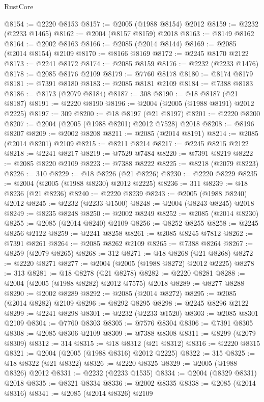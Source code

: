 \begin{lexlean}{RustCore}
\begin{coremodule}
@8154 := @2220 @8153
@8157 := @2005 (@1988 @8154) @2012
@8159 := @2232 (@2233 @1465)
@8162 := @2004 (@8157 @8159) @2018
@8163 := @8149 @8162
@8164 := @2002 @8163
@8166 := @2085 (@2014 @8144)
@8169 := @2085 (@2014 @8154) @2109
@8170 := @8166 @8169
@8172 := @2245 @8170 @2122
@8173 := @2241 @8172
@8174 := @2085 @8159
@8176 := @2232 (@2233 @1476)
@8178 := @2085 @8176 @2109
@8179 := @7760 @8178
@8180 := @8174 @8179
@8181 := @7391 @8180
@8183 := @2085 @8181 @2109
@8184 := @7388 @8183
@8186 := @8173 (@2079 @8184)
@8187 := 308
@8190 := @18 @8187 (@21 @8187)
@8191 := @2220 @8190
@8196 := @2004 (@2005 (@1988 @8191) @2012 @2225)
@8197 := 309
@8200 := @18 @8197 (@21 @8197)
@8201 := @2220 @8200
@8207 := @2004 (@2005 (@1988 @8201) @2012 @7528) @2018
@8208 := @8196 @8207
@8209 := @2002 @8208
@8211 := @2085 (@2014 @8191)
@8214 := @2085 (@2014 @8201) @2109
@8215 := @8211 @8214
@8217 := @2245 @8215 @2122
@8218 := @2241 @8217
@8219 := @7529 @7484
@8220 := @7391 @8219
@8222 := @2085 @8220 @2109
@8223 := @7388 @8222
@8225 := @8218 (@2079 @8223)
@8226 := 310
@8229 := @18 @8226 (@21 @8226)
@8230 := @2220 @8229
@8235 := @2004 (@2005 (@1988 @8230) @2012 @2225)
@8236 := 311
@8239 := @18 @8236 (@21 @8236)
@8240 := @2220 @8239
@8243 := @2005 (@1988 @8240) @2012
@8245 := @2232 (@2233 @1500)
@8248 := @2004 (@8243 @8245) @2018
@8249 := @8235 @8248
@8250 := @2002 @8249
@8252 := @2085 (@2014 @8230)
@8255 := @2085 (@2014 @8240) @2109
@8256 := @8252 @8255
@8258 := @2245 @8256 @2122
@8259 := @2241 @8258
@8261 := @2085 @8245 @7812
@8262 := @7391 @8261
@8264 := @2085 @8262 @2109
@8265 := @7388 @8264
@8267 := @8259 (@2079 @8265)
@8268 := 312
@8271 := @18 @8268 (@21 @8268)
@8272 := @2220 @8271
@8277 := @2004 (@2005 (@1988 @8272) @2012 @2225)
@8278 := 313
@8281 := @18 @8278 (@21 @8278)
@8282 := @2220 @8281
@8288 := @2004 (@2005 (@1988 @8282) @2012 @7575) @2018
@8289 := @8277 @8288
@8290 := @2002 @8289
@8292 := @2085 (@2014 @8272)
@8295 := @2085 (@2014 @8282) @2109
@8296 := @8292 @8295
@8298 := @2245 @8296 @2122
@8299 := @2241 @8298
@8301 := @2232 (@2233 @1520)
@8303 := @2085 @8301 @2109
@8304 := @7760 @8303
@8305 := @7576 @8304
@8306 := @7391 @8305
@8308 := @2085 @8306 @2109
@8309 := @7388 @8308
@8311 := @8299 (@2079 @8309)
@8312 := 314
@8315 := @18 @8312 (@21 @8312)
@8316 := @2220 @8315
@8321 := @2004 (@2005 (@1988 @8316) @2012 @2225)
@8322 := 315
@8325 := @18 @8322 (@21 @8322)
@8326 := @2220 @8325
@8329 := @2005 (@1988 @8326) @2012
@8331 := @2232 (@2233 @1535)
@8334 := @2004 (@8329 @8331) @2018
@8335 := @8321 @8334
@8336 := @2002 @8335
@8338 := @2085 (@2014 @8316)
@8341 := @2085 (@2014 @8326) @2109

\end{coremodule}
\end{lexlean}
